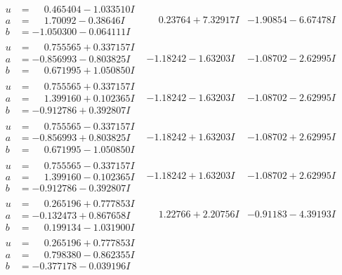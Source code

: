 \documentclass[1p]{elsarticle_modified}
\theoremstyle{definition}
\begin{document}
$$\begin{array}{c|c|c}
\begin{aligned}
u &= \phantom{-}0.465404 - 1.033510 I \\
a &= \phantom{-}1.70092 - 0.38646 I \\
b &= -1.050300 - 0.064111 I\end{aligned}
 & \phantom{-}0.23764 + 7.32917 I & -1.90854 - 6.67478 I \\ \hline\begin{aligned}
u &= \phantom{-}0.755565 + 0.337157 I \\
a &= -0.856993 - 0.803825 I \\
b &= \phantom{-}0.671995 + 1.050850 I\end{aligned}
 & -1.18242 - 1.63203 I & -1.08702 - 2.62995 I \\ \hline\begin{aligned}
u &= \phantom{-}0.755565 + 0.337157 I \\
a &= \phantom{-}1.399160 + 0.102365 I \\
b &= -0.912786 + 0.392807 I\end{aligned}
 & -1.18242 - 1.63203 I & -1.08702 - 2.62995 I \\ \hline\begin{aligned}
u &= \phantom{-}0.755565 - 0.337157 I \\
a &= -0.856993 + 0.803825 I \\
b &= \phantom{-}0.671995 - 1.050850 I\end{aligned}
 & -1.18242 + 1.63203 I & -1.08702 + 2.62995 I \\ \hline\begin{aligned}
u &= \phantom{-}0.755565 - 0.337157 I \\
a &= \phantom{-}1.399160 - 0.102365 I \\
b &= -0.912786 - 0.392807 I\end{aligned}
 & -1.18242 + 1.63203 I & -1.08702 + 2.62995 I \\ \hline\begin{aligned}
u &= \phantom{-}0.265196 + 0.777853 I \\
a &= -0.132473 + 0.867658 I \\
b &= \phantom{-}0.199134 - 1.031900 I\end{aligned}
 & \phantom{-}1.22766 + 2.20756 I & -0.91183 - 4.39193 I \\ \hline\begin{aligned}
u &= \phantom{-}0.265196 + 0.777853 I \\
a &= \phantom{-}0.798380 - 0.862355 I \\
b &= -0.377178 - 0.039196 I\end{aligned}

\end{array}$$
\end{document}
